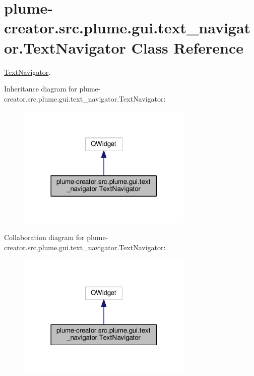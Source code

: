 \hypertarget{classplume-creator_1_1src_1_1plume_1_1gui_1_1text__navigator_1_1_text_navigator}{}\section{plume-\/creator.src.\+plume.\+gui.\+text\+\_\+navigator.\+Text\+Navigator Class Reference}
\label{classplume-creator_1_1src_1_1plume_1_1gui_1_1text__navigator_1_1_text_navigator}


\hyperlink{classplume-creator_1_1src_1_1plume_1_1gui_1_1text__navigator_1_1_text_navigator}{Text\+Navigator}.  




Inheritance diagram for plume-\/creator.src.\+plume.\+gui.\+text\+\_\+navigator.\+Text\+Navigator\+:\nopagebreak
\begin{figure}[H]
\begin{center}
\leavevmode
\includegraphics[width=237pt]{classplume-creator_1_1src_1_1plume_1_1gui_1_1text__navigator_1_1_text_navigator__inherit__graph}
\end{center}
\end{figure}


Collaboration diagram for plume-\/creator.src.\+plume.\+gui.\+text\+\_\+navigator.\+Text\+Navigator\+:\nopagebreak
\begin{figure}[H]
\begin{center}
\leavevmode
\includegraphics[width=237pt]{classplume-creator_1_1src_1_1plume_1_1gui_1_1text__navigator_1_1_text_navigator__coll__graph}
\end{center}
\end{figure}
